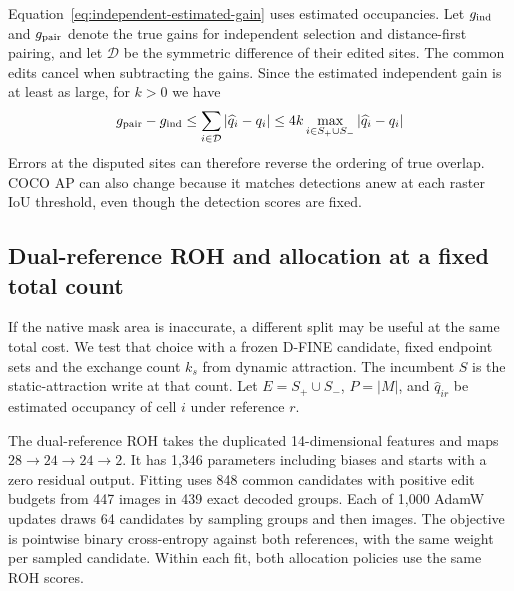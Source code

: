 \documentclass[journal]{IEEEtran}
\begin{document}
Equation~\eqref{eq:independent-estimated-gain} uses estimated occupancies. Let \(g_{\rm ind}\) and \(g_{\rm pair}\) denote the true gains for independent selection and distance-first pairing, and let \(\mathcal D\) be the symmetric difference of their edited sites. The common edits cancel when subtracting the gains. Since the estimated independent gain is at least as large, for \(k>0\) we have
\begin{equation}
 g_{\rm pair}-g_{\rm ind}
 \le \sum_{i\in\mathcal D}|\widehat q_i-q_i|
 \le 4k\max_{i\in S_+\cup S_-}|\widehat q_i-q_i|
 \label{eq:selection-error}
\end{equation}
Errors at the disputed sites can therefore reverse the ordering of true overlap. COCO AP can also change because it matches detections anew at each raster IoU threshold, even though the detection scores are fixed.

\subsection{Dual-reference ROH and allocation at a fixed total count}
\label{sec:variable-sign}

If the native mask area is inaccurate, a different split may be useful at the same total cost. We test that choice with a frozen D-FINE candidate, fixed endpoint sets and the exchange count \(k_s\) from dynamic attraction. The incumbent \(S\) is the static-attraction write at that count. Let \(E=S_+\cup S_-\), \(P=|M|\), and \(\hat q_{ir}\) be estimated occupancy of cell \(i\) under reference \(r\).

The dual-reference ROH takes the duplicated 14-dimensional features and maps \(28\to24\to24\to2\). It has 1,346 parameters including biases and starts with a zero residual output. Fitting uses 848 common candidates with positive edit budgets from 447 images in 439 exact decoded groups. Each of 1,000 AdamW updates draws 64 candidates by sampling groups and then images. The objective is pointwise binary cross-entropy against both references, with the same weight per sampled candidate. Within each fit, both allocation policies use the same ROH scores.
\end{document}
